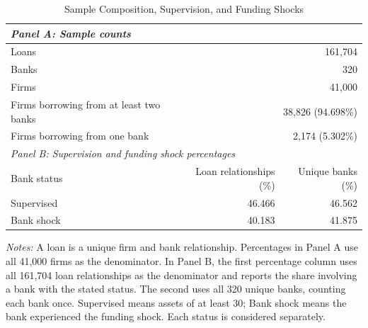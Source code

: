 \begin{table}[H]
\centering
\begin{minipage}{0.85\textwidth}
\centering
\caption{Sample Composition, Supervision, and Funding Shocks}
\label{tab:q1_sample}
\begingroup\small
\renewcommand{\arraystretch}{1.15}
\begin{tabular*}{\linewidth}{@{\extracolsep{\fill}}lrr@{}}
\toprule
\multicolumn{3}{l}{\textit{Panel A: Sample counts}} \\
\midrule
Loans & \multicolumn{2}{r}{161,704} \\
Banks & \multicolumn{2}{r}{320} \\
Firms & \multicolumn{2}{r}{41,000} \\
\hspace*{1.5em}Firms borrowing from at least two banks & \multicolumn{2}{r}{38,826 (94.698\%)} \\
\hspace*{1.5em}Firms borrowing from one bank & \multicolumn{2}{r}{2,174 (5.302\%)} \\
\midrule
\multicolumn{3}{l}{\textit{Panel B: Supervision and funding shock percentages}} \\
\midrule
Bank status & Loan relationships (\%) & Unique banks (\%) \\
Supervised & 46.466 & 46.562 \\
Bank shock & 40.183 & 41.875 \\
\bottomrule
\end{tabular*}
\par\smallskip
\begin{minipage}{\linewidth}\footnotesize
\textit{Notes:} A loan is a unique firm and bank relationship. Percentages in Panel A use all 41,000 firms as the denominator. In Panel B, the first percentage column uses all 161,704 loan relationships as the denominator and reports the share involving a bank with the stated status. The second uses all 320 unique banks, counting each bank once. Supervised means assets of at least 30; Bank shock means the bank experienced the funding shock. Each status is considered separately.
\end{minipage}
\endgroup
\end{minipage}
\end{table}
